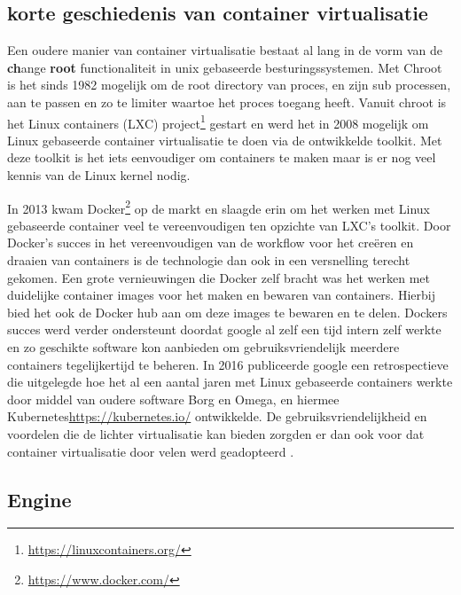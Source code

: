 \subsection{korte geschiedenis van container virtualisatie}

Een oudere manier van container virtualisatie bestaat al lang in de vorm van de \textbf{ch}ange \textbf{root} functionaliteit in unix gebaseerde besturingssystemen. Met Chroot is het sinds 1982 mogelijk om de root directory van proces, en zijn sub processen, aan te passen en zo te limiter waartoe het proces toegang heeft. Vanuit chroot is het Linux containers (LXC) project\footnote{\url{https://linuxcontainers.org/}} gestart en werd het in 2008 mogelijk om Linux gebaseerde container virtualisatie te doen via de ontwikkelde toolkit. Met deze toolkit is het iets eenvoudiger om containers te maken maar is er nog veel kennis van de Linux kernel nodig\autocite{Eder2016,SenthilKumaran2017}.

In 2013 kwam Docker\footnote{\url{https://www.docker.com/}} op de markt en slaagde erin om het werken met Linux gebaseerde container veel te vereenvoudigen ten opzichte van LXC’s toolkit. Door Docker’s succes in het vereenvoudigen van de workflow voor het creëren en draaien van containers is de technologie dan ook in een versnelling terecht gekomen.  Een grote vernieuwingen die Docker zelf bracht was het werken met duidelijke container images voor het maken en bewaren van containers. Hierbij bied het ook de Docker hub aan om deze images te bewaren en te delen. Dockers succes werd verder ondersteunt doordat google  al zelf een tijd intern zelf werkte en zo geschikte software kon aanbieden om gebruiksvriendelijk  meerdere containers tegelijkertijd te beheren. In 2016 publiceerde google een retrospectieve die uitgelegde hoe het al een aantal jaren met Linux gebaseerde containers werkte door middel van oudere software Borg en Omega, en hiermee Kubernetes{\url{https://kubernetes.io/}} ontwikkelde. De gebruiksvriendelijkheid en voordelen die de lichter virtualisatie kan bieden zorgden er dan ook voor dat container virtualisatie door velen werd geadopteerd \autocite{Eder2016}.

\subsection{Engine}

